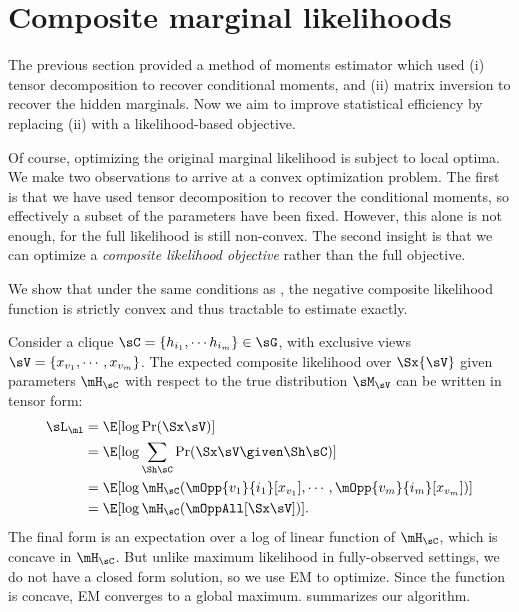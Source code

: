 \section{Composite marginal likelihoods}
\label{sec:piecewise}

The previous section provided a method of moments estimator
which used (i) tensor decomposition to recover conditional moments,
and (ii) matrix inversion to recover the hidden marginals.
Now we aim to improve statistical efficiency by replacing (ii) with a likelihood-based objective.

Of course, optimizing the original marginal likelihood is subject to local optima.
We make two observations to arrive at a convex optimization problem.
The first is that we have used tensor decomposition to recover the conditional moments,
so effectively a subset of the parameters have been fixed.
However, this alone is not enough, for the full likelihood is still non-convex.
The second insight is that we can optimize a \emph{composite likelihood objective} \cite{lindsay88composite}
rather than the full objective.

We show that under the same conditions as , the
  negative composite likelihood function is strictly convex and thus
  tractable to estimate exactly.

Consider a clique $\sC = \{h_{i_1}, \cdots h_{i_m}\} \in \sG$, with
  exclusive views $\sV = \{x_{v_1}, \cdots, x_{v_m}\}$. 
The expected composite likelihood over $\Sx{\sV}$ given parameters $\mH_\sC$
with respect to the true distribution $\sM_\sV$ can be written in tensor form:
\begin{align}
  \sL_\ml %
  &= \E[\log \Pr( \Sx \sV )] \nonumber \\
  &= \E[\log \sum_{\Sh \sC} \Pr( \Sx \sV \given \Sh \sC )] \nonumber \\
  &= \E[\log \mH_\sC(\mOpp{v_1}{i_1} [x_{v_1}], \cdots, \mOpp{v_m}{i_m} [x_{v_m}])] \nonumber \\
  &= \E[\log \mH_\sC(\mOppAll[\Sx\sV])]. \label{eqn:piecewise-obj}
\end{align}
The final form is an expectation over a log of linear function of $\mH_\sC$, which is concave in
$\mH_\sC$.  But unlike maximum likelihood in fully-observed settings,
we do not have a closed form solution, so we use EM to optimize.
Since the function is concave, EM converges to a global maximum.
 summarizes our algorithm.

